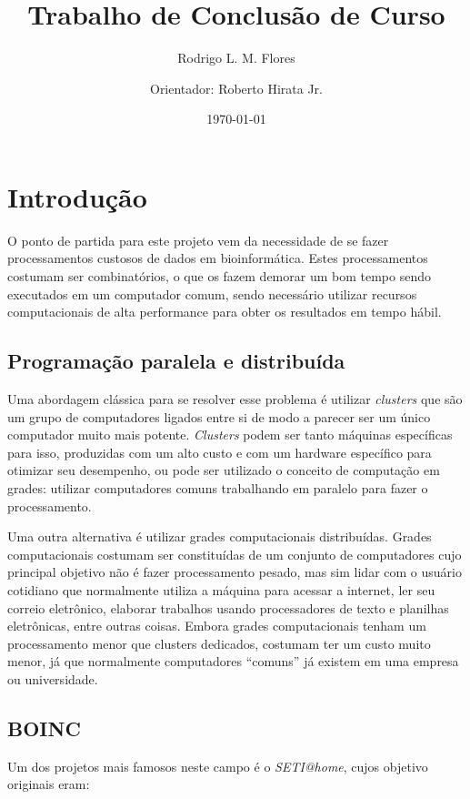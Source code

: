\documentclass[a4paper,12pt,titlepage]{article}
\title{Trabalho de Conclusão de Curso \\ }
\author{Rodrigo L. M. Flores \and
        Orientador: Roberto Hirata Jr. }
\date{\today}
\begin{document}
\maketitle

\section{Introdução}

O ponto de partida para este projeto vem da necessidade de se fazer processamentos custosos de 
dados em bioinformática. Estes processamentos costumam ser combinatórios, o que os fazem
demorar um bom tempo sendo executados em um computador comum, sendo necessário utilizar recursos
computacionais de alta performance para obter os resultados em tempo hábil.

\subsection{Programação paralela e distribuída}

Uma abordagem clássica para se resolver esse problema é utilizar \textit{clusters} que são um grupo de computadores
ligados entre si de modo a parecer ser um único computador muito mais potente. \textit{Clusters} podem ser tanto máquinas
específicas para isso, produzidas com um alto custo e com um hardware específico para otimizar seu desempenho, ou 
pode ser utilizado o conceito de computação em grades: utilizar computadores comuns trabalhando em paralelo 
para fazer o processamento. 

Uma outra alternativa é utilizar grades computacionais distribuídas. Grades computacionais costumam ser constituídas
de um conjunto de computadores cujo principal objetivo não é fazer processamento pesado, mas sim lidar com o usuário 
cotidiano que normalmente utiliza a máquina para acessar a internet, ler seu correio eletrônico, elaborar
trabalhos usando processadores de texto e planilhas eletrônicas, entre outras coisas. Embora grades computacionais tenham um 
processamento menor que clusters dedicados, costumam ter um custo muito menor, já que normalmente computadores ``comuns'' já existem em
uma empresa ou universidade. 



\subsection{BOINC}

Um dos projetos mais famosos neste 
campo é o \textit{SETI@home}, cujos objetivo originais eram:
\end{document}
